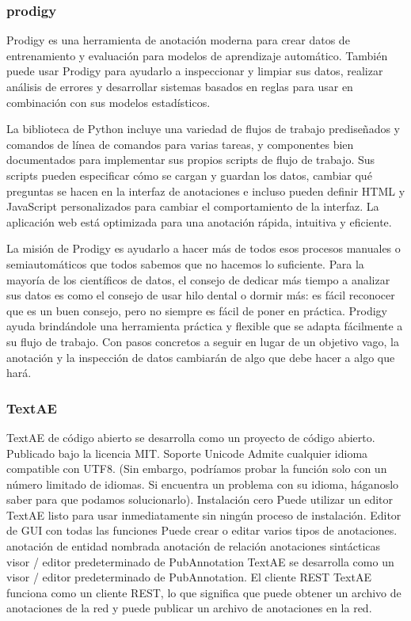 \subsubsection*{prodigy}

Prodigy es una herramienta de anotación moderna para crear datos de entrenamiento y evaluación para modelos de aprendizaje automático. También puede usar Prodigy para ayudarlo a inspeccionar y limpiar sus datos, realizar análisis de errores y desarrollar sistemas basados en reglas para usar en combinación con sus modelos estadísticos.

La biblioteca de Python incluye una variedad de flujos de trabajo prediseñados y comandos de línea de comandos para varias tareas, y componentes bien documentados para implementar sus propios scripts de flujo de trabajo. Sus scripts pueden especificar cómo se cargan y guardan los datos, cambiar qué preguntas se hacen en la interfaz de anotaciones e incluso pueden definir HTML y JavaScript personalizados para cambiar el comportamiento de la interfaz. La aplicación web está optimizada para una anotación rápida, intuitiva y eficiente.

La misión de Prodigy es ayudarlo a hacer más de todos esos procesos manuales o semiautomáticos que todos sabemos que no hacemos lo suficiente. Para la mayoría de los científicos de datos, el consejo de dedicar más tiempo a analizar sus datos es como el consejo de usar hilo dental o dormir más: es fácil reconocer que es un buen consejo, pero no siempre es fácil de poner en práctica. Prodigy ayuda brindándole una herramienta práctica y flexible que se adapta fácilmente a su flujo de trabajo. Con pasos concretos a seguir en lugar de un objetivo vago, la anotación y la inspección de datos cambiarán de algo que debe hacer a algo que hará.

\subsubsection*{TextAE}

TextAE de código abierto se desarrolla como un proyecto de código abierto. Publicado bajo la licencia MIT. Soporte Unicode Admite cualquier idioma compatible con UTF8. (Sin embargo, podríamos probar la función solo con un número limitado de idiomas. Si encuentra un problema con su idioma, háganoslo saber para que podamos solucionarlo). Instalación cero
Puede utilizar un editor TextAE listo para usar inmediatamente sin ningún proceso de instalación.
Editor de GUI con todas las funciones
Puede crear o editar varios tipos de anotaciones. anotación de entidad nombrada anotación de relación anotaciones sintácticas visor / editor predeterminado de PubAnnotation TextAE se desarrolla como un visor / editor predeterminado de PubAnnotation.
El cliente REST TextAE funciona como un cliente REST, lo que significa que puede obtener un archivo de anotaciones de la red y puede publicar un archivo de anotaciones en la red.

